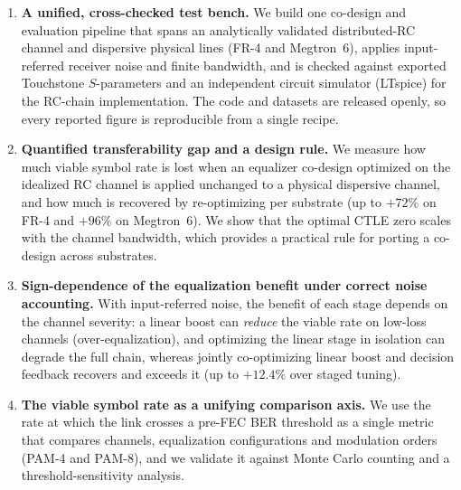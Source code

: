 \documentclass{ieeeaccess}
\begin{document}
\begin{enumerate}
\item \textbf{A unified, cross-checked test bench.} We build one co-design
and evaluation pipeline that spans an analytically validated
distributed-RC channel and dispersive physical lines (FR-4 and Megtron~6),
applies input-referred receiver noise and finite bandwidth, and is checked
against exported Touchstone $S$-parameters and an independent circuit
simulator (LTspice) for the RC-chain implementation. The code and datasets
are released openly, so every reported figure is reproducible from a single
recipe.
\item \textbf{Quantified transferability gap and a design rule.} We measure
how much viable symbol rate is lost when an equalizer co-design optimized on
the idealized RC channel is applied unchanged to a physical dispersive
channel, and how much is recovered by re-optimizing per substrate (up to
$+72\%$ on FR-4 and $+96\%$ on Megtron~6). We show that the optimal CTLE
zero scales with the channel bandwidth, which provides a practical rule for
porting a co-design across substrates.
\item \textbf{Sign-dependence of the equalization benefit under correct
noise accounting.} With input-referred noise, the benefit of each stage
depends on the channel severity: a linear boost can \emph{reduce} the viable
rate on low-loss channels (over-equalization), and optimizing the linear
stage in isolation can degrade the full chain, whereas jointly
co-optimizing linear boost and decision feedback recovers and exceeds it
(up to $+12.4\%$ over staged tuning).
\item \textbf{The viable symbol rate as a unifying comparison axis.} We use
the rate at which the link crosses a pre-FEC BER threshold as a single
metric that compares channels, equalization configurations and modulation
orders (PAM-4 and PAM-8), and we validate it against Monte Carlo counting
and a threshold-sensitivity analysis.
\end{enumerate}
\end{document}
